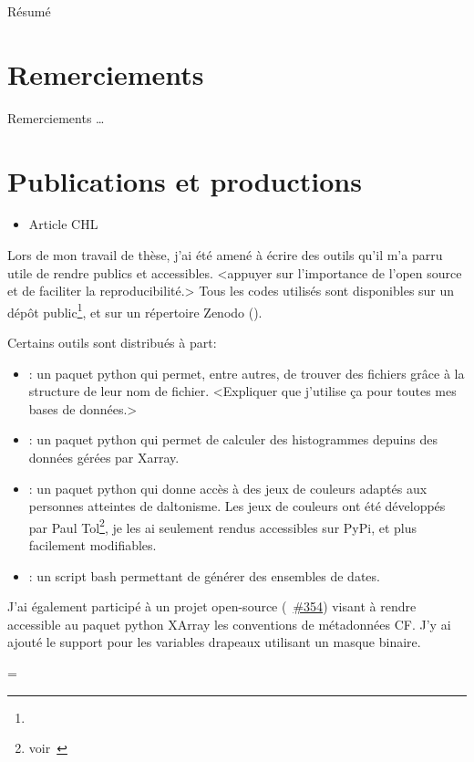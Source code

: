 
Résumé

\clearpage
\section*{Remerciements}
\label{sec:thanks}
Remerciements \dots

\clearpage
\section{Publications et productions}
\label{sec:productions}

\begin{itemize}
        \item Article CHL
\end{itemize}
\medskip

Lors de mon travail de thèse, j'ai été amené à écrire des outils qu'il m'a parru utile de rendre publics et accessibles.
<appuyer sur l'importance de l'open source et de faciliter la reproducibilité.>
Tous les codes utilisés sont disponibles sur un dépôt public\footnote{
}, et sur un répertoire Zenodo ().
\medskip

Certains outils sont distribués à part:
\begin{itemize}
  \item {}:
        un paquet python qui permet, entre autres, de trouver des fichiers grâce à la structure de leur nom de fichier.
        <Expliquer que j'utilise ça pour toutes mes bases de données.>
  \item {}:
        un paquet python qui permet de calculer des histogrammes depuins des données gérées par Xarray.
  \item {}:
        un paquet python qui donne accès à des jeux de couleurs adaptés aux personnes atteintes de daltonisme. Les jeux de couleurs ont été développés par Paul Tol\footnote{voir~}, je les ai seulement rendus accessibles sur PyPi, et plus facilement modifiables.
  \item {}:
        un script bash permettant de générer des ensembles de dates.
\end{itemize}
\medskip

J'ai également participé à un projet open-source (~\href{https://github.com/xarray-contrib/cf-xarray/pull/354}{\#354}) visant à rendre accessible au paquet python XArray les conventions de métadonnées CF.\@
J'y ai ajouté le support pour les variables drapeaux utilisant un masque binaire.

{
  \raggedright
  \emergencystretch=\textwidth
  \printbibliography[heading=none, type=software, keyword=personnal]
}
